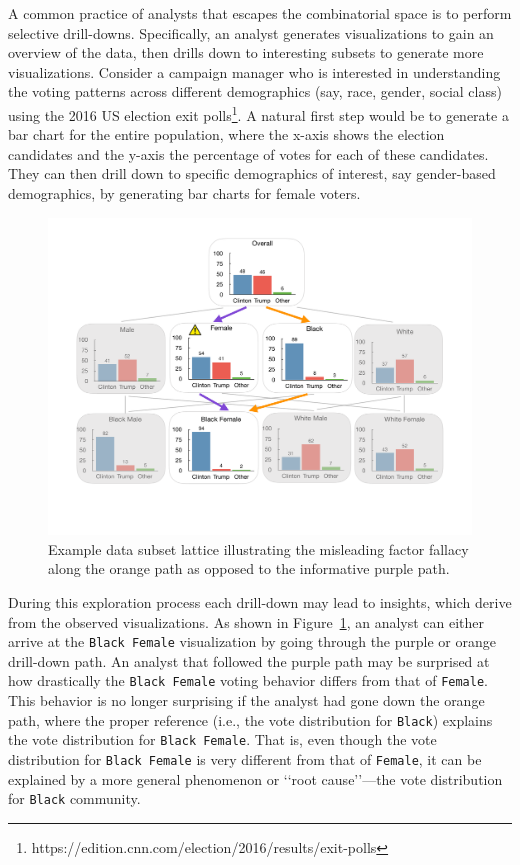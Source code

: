 A common practice of analysts that escapes the combinatorial space is to perform selective drill-downs. Specifically, an analyst generates visualizations to gain an overview of the data, then drills down to interesting subsets to generate more visualizations. Consider a campaign manager who is interested in understanding the voting patterns across different demographics (say, race, gender, social class) using the 2016 US election exit polls\footnote{https://edition.cnn.com/election/2016/results/exit-polls}. A natural first step would be to generate a bar chart for the entire population, where the x-axis shows the election candidates and the y-axis the percentage of votes for each of these candidates. They can then drill down to specific demographics of interest, say gender-based demographics, by generating bar charts for female voters.

\begin{figure}[h!]
\includegraphics[width=\linewidth]{figures/elections_example_lattice_teaser.pdf}
\caption{Example data subset lattice illustrating the misleading factor fallacy along the orange path as opposed to the informative purple path.}
\label{fig:elections_example}
\end{figure}


During this exploration process each drill-down may lead to insights, which derive from the observed visualizations. As shown in Figure~\ref{fig:elections_example}, an analyst can either arrive at the \texttt{Black Female} visualization by going through the purple or orange drill-down path. An analyst that followed the purple path may be surprised at how drastically the \texttt{Black Female} voting behavior differs from that of \texttt{Female}. This behavior is no longer surprising if the analyst had gone down the orange path, where the proper reference (i.e., the vote distribution for \texttt{Black}) explains the vote distribution for \texttt{Black Female}. That is, even though the vote distribution for 
\texttt{Black Female} is very different from that of \texttt{Female}, it can be explained by a more general phenomenon or \lq\lq root cause\rq\rq ---the vote distribution for \texttt{Black} community.


